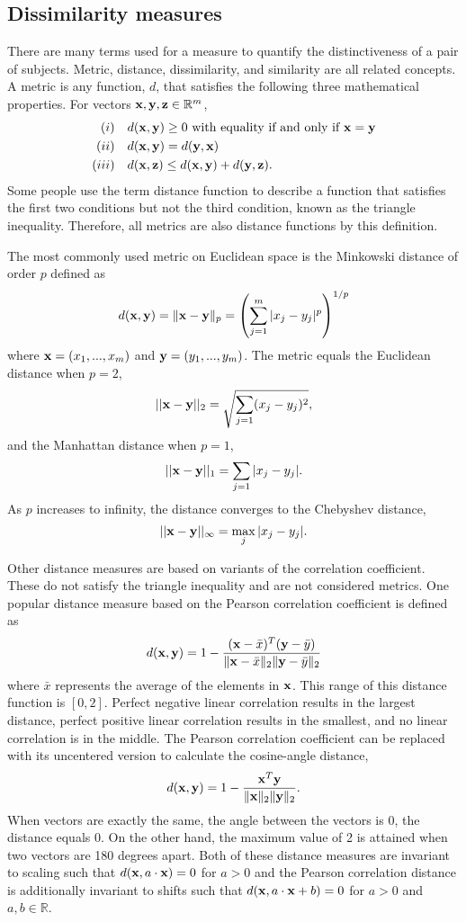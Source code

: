 \subsection{Dissimilarity measures}
There are many terms used for a measure to quantify the distinctiveness of a pair of subjects. Metric, distance, dissimilarity, and similarity are all related concepts. A metric is any function, $d$, that satisfies the following three mathematical properties. For vectors $\mathbf x,\mathbf y,\mathbf z \in\mathbb{R}^{m}$,
\begin{align*}
(i)& \quad d(\mathbf x,\mathbf y)\geq 0 \text{ with equality if and only if }\mathbf x =\mathbf y\\
(ii)& \quad d(\mathbf x,\mathbf y) = d(\mathbf y,\mathbf x)\\
(iii)&\quad d(\mathbf x,\mathbf z) \leq d(\mathbf x,\mathbf y) + d(\mathbf y,\mathbf z).
\end{align*}
Some people use the term distance function to describe a function that satisfies the first two conditions but not the third condition, known as the triangle inequality. Therefore, all metrics are also distance functions by this definition.

The most commonly used metric on Euclidean space is the Minkowski distance of order $p$ defined as
$$d(\mathbf x,\mathbf y) = \|\mathbf x - \mathbf y\|_{p} = \left(\sum^{m}_{j=1}|x_{j}-y_{j}|^{p}\right)^{1/p}$$
where $\mathbf x = (x_{1},...,x_{m})$ and $\mathbf y = (y_{1},...,y_{m})$. The metric equals the Euclidean distance when $p=2$,
$$||\mathbf x - \mathbf y||_{2}=\sqrt{\sum_{j=1}(x_{j}-y_{j})^{2}},$$
and the Manhattan distance when $p=1$,
$$||\mathbf x - \mathbf y||_{1}=\sum_{j=1}|x_{j}-y_{j}|.$$
As $p$ increases to infinity, the distance converges to the Chebyshev distance,
$$||\mathbf x - \mathbf y||_{\infty}=\max_{j}|x_{j}-y_{j}|.$$

Other distance measures are based on variants of the correlation coefficient. These do not satisfy the triangle inequality and are not considered metrics. One popular distance measure based on the Pearson correlation coefficient is defined as
$$d(\mathbf x,\mathbf y) =1 - \frac{(\mathbf x - \bar{x})^{T}(\mathbf y - \bar{y})}{\|\mathbf x - \bar{x}\|_{2}\|\mathbf y - \bar{y}\|_{2}}$$
where $\bar{x}$ represents the average of the elements in $\mathbf x$. This range of this distance function is $[0,2]$. Perfect negative linear correlation results in the largest distance, perfect positive linear correlation results in the smallest, and no linear correlation is in the middle. The Pearson correlation coefficient can be replaced with its uncentered version to calculate the cosine-angle distance,
$$d(\mathbf x,\mathbf y) =1 - \frac{\mathbf x ^{T}\mathbf y }{\|\mathbf x\|_{2}\|\mathbf y \|_{2}}.$$
When vectors are exactly the same, the angle between the vectors is 0, the distance equals 0. On the other hand, the maximum value of 2 is attained when two vectors are 180 degrees apart. Both of these distance measures are invariant to scaling such that $d(\mathbf x, a\cdot \mathbf x) = 0$ for $a>0$ and the Pearson correlation distance is additionally invariant to shifts such that $d(\mathbf x, a\cdot \mathbf x +b) = 0$ for $a>0$ and $a,b\in \mathbb{R}$. 

